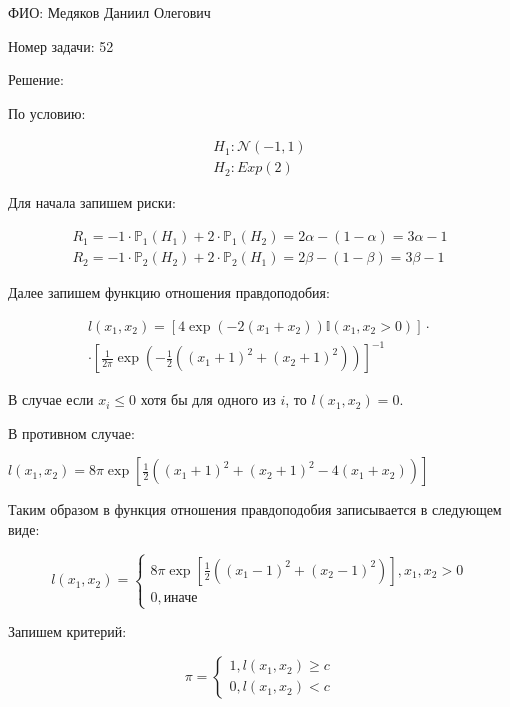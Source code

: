 \documentclass[14pt]{extarticle}
\begin{document}
ФИО: Медяков Даниил Олегович

\vspace{10pt}

Номер задачи: 52

\vspace{10pt}

Решение:

\vspace{10pt}

По условию:

\begin{gather*}
    H_1: \mathcal{N} (-1, 1)\\
    H_2: Exp(2)
\end{gather*}

Для начала запишем риски:

\begin{gather*}
    R_1 = -1\cdot\mathbb P_1(H_1) + 2\cdot\mathbb P_1(H_2) = 2\alpha - (1-\alpha) = 3\alpha - 1\\
    R_2 = -1\cdot\mathbb P_2(H_2) + 2\cdot\mathbb P_2(H_1) = 2\beta - (1-\beta) = 3\beta - 1
\end{gather*}

Далее запишем функцию отношения правдоподобия:

\begin{gather*}
    l(x_1, x_2) = \left[4\exp(-2(x_1 + x_2))\mathbb I (x_1, x_2 > 0)\right]\cdot\\
    \cdot\left[\frac{1}{2\pi}\exp(-\frac{1}{2}((x_1 + 1)^2 + (x_2 + 1)^2))\right]^{-1}
\end{gather*}

В случае если $x_i\leqslant 0$ хотя бы для одного из $i$, то $l(x_1, x_2) = 0$.

В противном случае:

$l(x_1, x_2) = 8\pi\exp\left[\frac{1}{2}((x_1 + 1)^2 + (x_2 + 1)^2 - 4(x_1 + x_2))\right]$

Таким образом в функция отношения правдоподобия записывается в следующем виде:

\begin{equation*}
    l(x_1, x_2) = 
    \begin{cases}
        8\pi\exp\left[\frac{1}{2}((x_1 - 1)^2 + (x_2 - 1)^2)\right], x_1, x_2 > 0\\
        0, \text{иначе}
    \end{cases}
\end{equation*}

Запишем критерий:

\begin{equation*}
    \pi = 
    \begin{cases}
        1, l(x_1, x_2) \geqslant c\\
        0, l(x_1, x_2) < c
    \end{cases}
\end{equation*}
\end{document}
